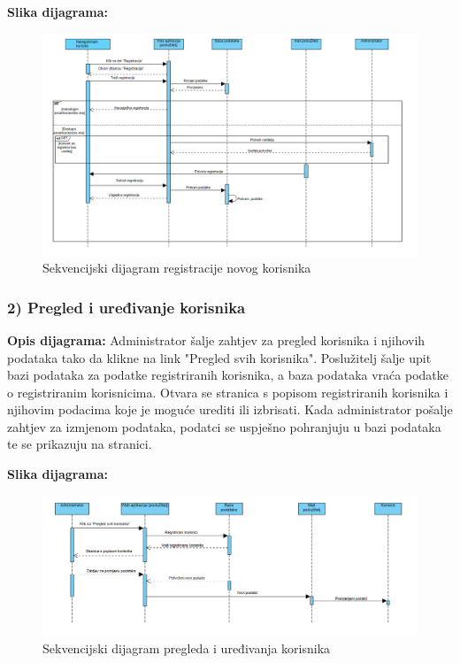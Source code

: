 				\textbf{Slika dijagrama:}
				\begin{figure}[H]
					\includegraphics[scale=0.4]{slike/Registracija}
					\centering
					\caption{Sekvencijski dijagram registracije novog korisnika}
					
				\end{figure}
				
				\subsubsection{2) Pregled i uređivanje korisnika}
				
				\textbf{Opis dijagrama:}
				Administrator šalje zahtjev za pregled korisnika i njihovih podataka tako da klikne na link "Pregled svih korisnika". Poslužitelj šalje upit bazi podataka za podatke registriranih korisnika, a baza podataka vraća podatke o registriranim korisnicima. Otvara se stranica s popisom registriranih korisnika i njihovim podacima koje je moguće urediti ili izbrisati. Kada administrator pošalje zahtjev za izmjenom podataka, podatci se uspješno pohranjuju u bazi podataka te se prikazuju na stranici. 
					
					\textbf{Slika dijagrama:}
					\begin{figure}[H]
					\centering
						\includegraphics[scale=0.4]{slike/Pregled korisnika}
						\centering
					\caption{Sekvencijski dijagram pregleda i uređivanja korisnika}
					\end{figure}
					
